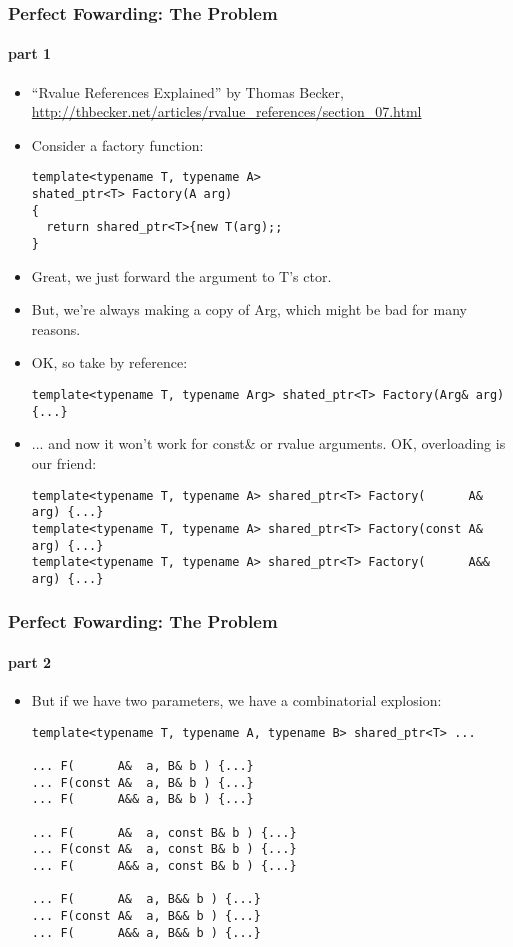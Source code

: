\begin{frame}[fragile,t]
\frametitle{Perfect Fowarding: The Problem}
\framesubtitle{part 1}
\begin{itemize}[<+->]
\item ``Rvalue References Explained'' by Thomas Becker, \url{http://thbecker.net/articles/rvalue_references/section_07.html}
\item Consider a factory function:
{\scriptsize\begin{verbatim}
template<typename T, typename A>
shated_ptr<T> Factory(A arg)
{
  return shared_ptr<T>{new T(arg);;
}
\end{verbatim}
}
\item Great, we just forward the argument to T's ctor.
\item But, we're always making a copy of Arg, which might be bad for
  many reasons.
\item OK, so take by reference:
{\scriptsize\begin{verbatim}
template<typename T, typename Arg> shated_ptr<T> Factory(Arg& arg) {...}
\end{verbatim}
}
\item ... and now it won't work for const\& or rvalue arguments.  OK,
  overloading is our friend:
{\scriptsize\begin{verbatim}
template<typename T, typename A> shared_ptr<T> Factory(      A&  arg) {...}
template<typename T, typename A> shared_ptr<T> Factory(const A&  arg) {...}
template<typename T, typename A> shared_ptr<T> Factory(      A&& arg) {...}
\end{verbatim}
}
\end{itemize}
\end{frame}

\begin{frame}[fragile,t]
\frametitle{Perfect Fowarding: The Problem}
\framesubtitle{part 2}
\begin{itemize}[<+->]
\item But if we have two parameters, we have a combinatorial
  explosion: 
{\scriptsize\begin{verbatim}
template<typename T, typename A, typename B> shared_ptr<T> ...

... F(      A&  a, B& b ) {...}
... F(const A&  a, B& b ) {...}
... F(      A&& a, B& b ) {...}

... F(      A&  a, const B& b ) {...}
... F(const A&  a, const B& b ) {...}
... F(      A&& a, const B& b ) {...}

... F(      A&  a, B&& b ) {...}
... F(const A&  a, B&& b ) {...}
... F(      A&& a, B&& b ) {...}
\end{verbatim}
}
\end{itemize}
\pause
{}
\end{frame}

